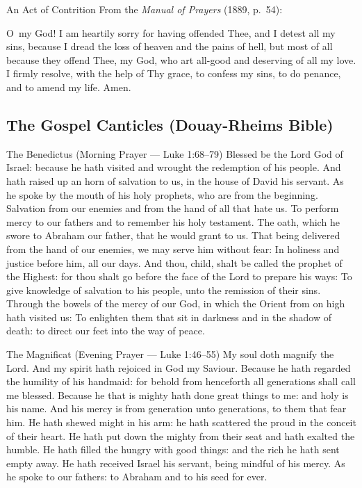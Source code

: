 \begin{massbox}{An Act of Contrition}
From the \textit{Manual of Prayers} (1889, p.~54):

\smallskip
O~my God! I am heartily sorry for having offended Thee, and I detest all my sins, because I dread the loss of heaven and the pains of hell, but most of all because they offend Thee, my God, who art all-good and deserving of all my love. I firmly resolve, with the help of Thy grace, to confess my sins, to do penance, and to amend my life. Amen.
\end{massbox}

\subsection{The Gospel Canticles (Douay-Rheims Bible)}

\begin{massbox}{The Benedictus (Morning Prayer --- Luke 1:68--79)}
Blessed be the Lord God of Israel: because he hath visited and wrought the redemption of his people. And hath raised up an horn of salvation to us, in the house of David his servant. As he spoke by the mouth of his holy prophets, who are from the beginning. Salvation from our enemies and from the hand of all that hate us. To perform mercy to our fathers and to remember his holy testament. The oath, which he swore to Abraham our father, that he would grant to us. That being delivered from the hand of our enemies, we may serve him without fear: In holiness and justice before him, all our days. And thou, child, shalt be called the prophet of the Highest: for thou shalt go before the face of the Lord to prepare his ways: To give knowledge of salvation to his people, unto the remission of their sins. Through the bowels of the mercy of our God, in which the Orient from on high hath visited us: To enlighten them that sit in darkness and in the shadow of death: to direct our feet into the way of peace.
\end{massbox}

\begin{massbox}{The Magnificat (Evening Prayer --- Luke 1:46--55)}
My soul doth magnify the Lord. And my spirit hath rejoiced in God my Saviour. Because he hath regarded the humility of his handmaid: for behold from henceforth all generations shall call me blessed. Because he that is mighty hath done great things to me: and holy is his name. And his mercy is from generation unto generations, to them that fear him. He hath shewed might in his arm: he hath scattered the proud in the conceit of their heart. He hath put down the mighty from their seat and hath exalted the humble. He hath filled the hungry with good things: and the rich he hath sent empty away. He hath received Israel his servant, being mindful of his mercy. As he spoke to our fathers: to Abraham and to his seed for ever.
\end{massbox}

